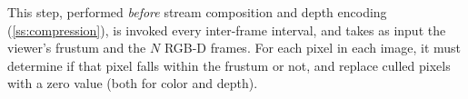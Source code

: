 


This step, performed \textit{before} stream composition and depth encoding (\cref{ss:compression}), is invoked every inter-frame interval, and takes as input the viewer's frustum and the $N$ RGB-D frames.
%
For each pixel in each image, it must determine if that pixel falls within the frustum or not, and replace culled pixels with a zero value (both for color and depth).
%
%
%

